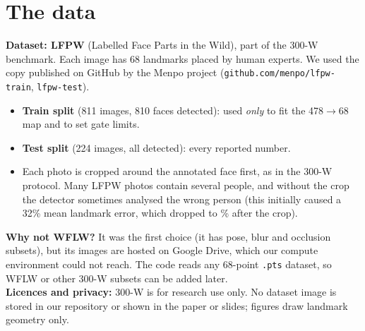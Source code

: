 \section{The data}
\textbf{Dataset: LFPW} (Labelled Face Parts in the Wild), part of the 300-W benchmark. Each
image has 68 landmarks placed by human experts. We used the copy published on GitHub by the
Menpo project (\texttt{github.com/menpo/lfpw-train}, \texttt{lfpw-test}).
\begin{itemize}
\item \textbf{Train split} (811 images, 810 faces detected): used \emph{only} to fit the 478$\to$68
map and to set gate limits.
\item \textbf{Test split} (224 images, all detected): every reported number.
\item Each photo is cropped around the annotated face first, as in the 300-W protocol.
Many LFPW photos contain several people, and without the crop the detector sometimes
analysed the wrong person (this initially caused a 32\% mean landmark error, which dropped
to \nmeFitInner\% after the crop).
\end{itemize}
\textbf{Why not WFLW?} It was the first choice (it has pose, blur and occlusion subsets), but
its images are hosted on Google Drive, which our compute environment could not reach. The
code reads any 68-point \texttt{.pts} dataset, so WFLW or other 300-W subsets can be added later.\\
\textbf{Licences and privacy:} 300-W is for research use only. No dataset image is stored
in our repository or shown in the paper or slides; figures draw landmark geometry only.
